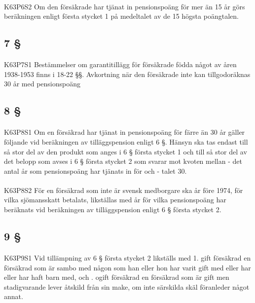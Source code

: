 \documentclass[a4paper,notitlepage,openany,10pt]{book}
\begin{document}
\paragraph*{}
{\tiny K63P6S2}
Om den försäkrade har tjänat in pensionspoäng för mer än 15 år görs beräkningen enligt första stycket 1 på medeltalet av de 15 högsta poängtalen.
\subsection*{7 §}
\paragraph*{}
{\tiny K63P7S1}
Bestämmelser om garantitillägg för försäkrade födda något av åren 1938-1953 finns i 18-22 §§.
Avkortning när den försäkrade inte kan tillgodoräknas 30 år med pensionspoäng
\subsection*{8 §}
\paragraph*{}
{\tiny K63P8S1}
Om en försäkrad har tjänat in pensionspoäng för färre än 30 år gäller följande vid beräkningen av tilläggspension enligt 6 §. Hänsyn ska tas endast till så stor del av den produkt som anges i 6 § första stycket 1 och till så stor del av det belopp som avses i 6 § första stycket 2 som svarar mot kvoten mellan
\newline - det antal år som pensionspoäng har tjänats in för och
\newline - talet 30.
\paragraph*{}
{\tiny K63P8S2}
För en försäkrad som inte är svensk medborgare ska år före 1974, för vilka sjömansskatt betalats, likställas med år för vilka pensionspoäng har beräknats vid beräkningen av tilläggspension enligt 6 § första stycket 2.
\subsection*{9 §}
\paragraph*{}
{\tiny K63P9S1}
Vid tillämpning av 6 § första stycket 2 likställs med 1. gift försäkrad en försäkrad som är sambo med någon som han eller hon har varit gift med eller har eller har haft barn med, och
. ogift försäkrad en försäkrad som är gift men stadigvarande lever åtskild från sin make, om inte särskilda skäl föranleder något annat.
\end{document}
